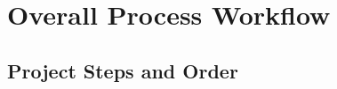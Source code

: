 \documentclass [12pt]{article}
\begin{document}
																																																					  





																																																					  \pagebreak


																																																					  \section{Overall Process Workflow}
																																																					  \subsection{Project Steps and Order}
\end{document}
